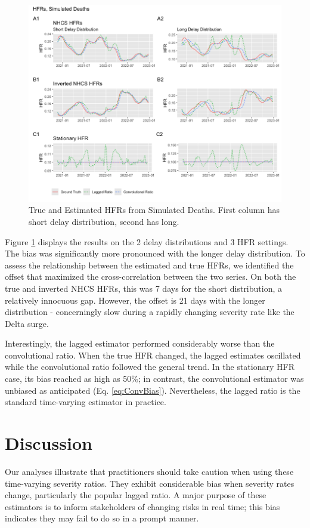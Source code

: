 \documentclass{article}
\begin{document}
\begin{figure}
    \centering
    \includegraphics[width=0.9\linewidth]{Figs/simulated_results2.png}
    \caption{True and Estimated HFRs from Simulated Deaths. First column has short delay distribution, second has long.}
    \label{fig:sims}
\end{figure}

Figure \ref{fig:sims} displays the results on the 2 delay distributions and 3 HFR settings. The bias was significantly more pronounced with the longer delay distribution. To assess the relationship between the estimated and true HFRs, we identified the offset that maximized the cross-correlation between the two series. On both the true and inverted NHCS HFRs, this was 7 days for the short distribution, a relatively innocuous gap. However, the offset is 21 days with the longer distribution - concerningly slow during a rapidly changing severity rate like the Delta surge.

Interestingly, the lagged estimator performed considerably worse than the convolutional ratio. When the true HFR changed, the lagged estimates oscillated while the convolutional ratio followed the general trend. In the stationary HFR case, its bias reached as high as 50\%; in contrast, the convolutional estimator was unbiased as anticipated (Eq. \ref{eq:ConvBias}). Nevertheless, the lagged ratio is the standard time-varying estimator in practice. 

\section{Discussion}

Our analyses illustrate that practitioners should take caution when using these time-varying severity ratios. They exhibit considerable bias when severity rates change, particularly the popular lagged ratio. A major purpose of these estimators is to inform stakeholders of changing risks in real time; this bias indicates they may fail to do so in a prompt manner.
\end{document}
